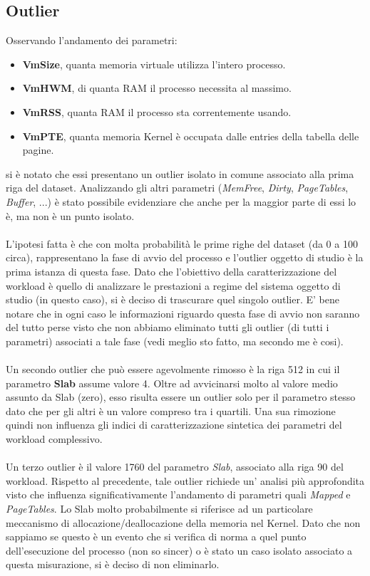 \subsection{Outlier}
Osservando l'andamento dei parametri:
\begin{itemize}
	\item \textbf{VmSize}, quanta memoria virtuale utilizza l'intero processo.
	\item \textbf{VmHWM}, di quanta RAM il processo necessita al massimo.
	\item \textbf{VmRSS}, quanta RAM il processo sta correntemente usando.
	\item \textbf{VmPTE}, quanta memoria Kernel è occupata dalle entries della tabella delle pagine.
\end{itemize}
si è notato che essi presentano un outlier isolato in comune associato alla prima riga del dataset. Analizzando gli altri parametri (\textit{MemFree}, \textit{Dirty}, \textit{PageTables}, \textit{Buffer}, ...) è stato possibile evidenziare che anche per la maggior parte di essi lo è, ma non è un punto isolato. 
\\
\\
L'ipotesi fatta è che con molta probabilità le prime righe del dataset (da 0 a 100 circa), rappresentano la fase di avvio del processo e l'outlier oggetto di studio è la prima istanza di questa fase. Dato che l'obiettivo della caratterizzazione del workload è quello di analizzare le prestazioni a regime del sistema oggetto di studio (in questo caso), si è deciso di trascurare quel singolo outlier. E' bene notare che in ogni caso le informazioni riguardo questa fase di avvio non saranno del tutto perse visto che non abbiamo eliminato tutti gli outlier (di tutti i parametri) associati a tale fase (vedi meglio sto fatto, ma secondo me è cosi).
\\
\\
Un secondo outlier che può essere agevolmente rimosso è la riga 512 in cui il parametro \textbf{Slab} assume valore 4. Oltre ad avvicinarsi molto al valore medio assunto da Slab (zero), esso risulta essere un outlier solo per il parametro stesso dato che per gli altri è un valore compreso tra i quartili. Una sua rimozione quindi non influenza gli indici di caratterizzazione sintetica dei parametri del workload complessivo.
\\
\\
Un terzo outlier è il valore 1760 del parametro \textit{Slab}, associato alla riga 90 del workload. Rispetto al precedente, tale outlier richiede un' analisi più approfondita visto che influenza significativamente l'andamento di parametri quali \textit{Mapped} e \textit{PageTables}. 
Lo Slab molto probabilmente si riferisce ad un particolare meccanismo di allocazione/deallocazione della memoria nel Kernel.
Dato che non sappiamo se questo è un evento che si verifica di norma a quel punto dell'esecuzione del processo (non so sincer) o è stato un caso isolato associato a questa misurazione, si è deciso di non eliminarlo. 
\newpage

